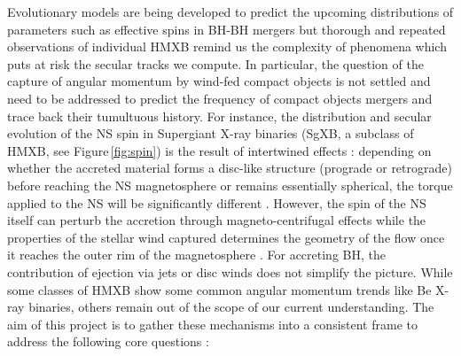 \documentclass[letterpaper,12pt,onecolumn]{article}
\makeatletter
\newcommand{\sgx}{SgXB\xspace}
\newcommand*{\hmxb}{HMXB\@\xspace}
\newcommand*{\ns}{NS\@\xspace}
\newcommand*{\bh}{BH\@\xspace}
\makeatother
\begin{document}
Evolutionary models are being developed to predict the upcoming distributions of parameters such as effective spins in \bh-\bh mergers \citep{Belczynski2017} but thorough and repeated observations of individual \hmxb remind us the complexity of phenomena which puts at risk the secular tracks we compute. In particular, the question of the capture of angular momentum by wind-fed compact objects is not settled and need to be addressed to predict the frequency of compact objects mergers and trace back their tumultuous history. For instance, the distribution and secular evolution of the \ns spin in Supergiant X-ray binaries (\sgx, a subclass of \hmxb, see Figure\,\ref{fig:spin}) is the result of intertwined effects : depending on whether the accreted material forms a disc-like structure (prograde or retrograde) before reaching the \ns magnetosphere or remains essentially spherical, the torque applied to the \ns will be significantly different \citep{Ghosh1978,Shakura2012}. However, the spin of the \ns itself can perturb the accretion through magneto-centrifugal effects \citep{Bozzo2008} while the properties of the stellar wind captured determines the geometry of the flow once it reaches the outer rim of the magnetosphere \citep{ElMellah2018}. For accreting \bh, the contribution of ejection via jets or disc winds does not simplify the picture. While some classes of \hmxb show some common angular momentum trends like Be X-ray binaries, others remain out of the scope of our current understanding. The aim of this project is to gather these mechanisms into a consistent frame to address the following core questions :





\end{document}
